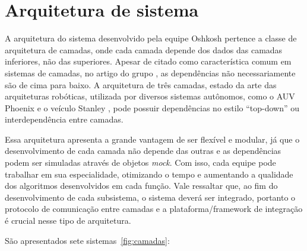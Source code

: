 \section{Arquitetura de sistema}

A arquitetura do sistema desenvolvido pela equipe Oshkosh pertence a classe de
arquitetura de camadas, onde cada camada depende dos dados das camadas
inferiores, não das superiores. Apesar de citado como característica comum
em sistemas de camadas, no artigo do grupo \citep{chen2009terramax}, as
dependências não necessariamente são de cima para baixo. A arquitetura de três
camadas, estado da arte das arquiteturas robóticas, utilizada por diversos
sistemas autônomos, como o AUV Phoenix \citep{gat1991reliable} e o veículo
Stanley \citep{montemerlo2006winning}, pode possuir dependências no estilo
``top-down'' ou interdependência entre camadas.

Essa arquitetura apresenta a grande vantagem de ser flexível e
modular, já que o desenvolvimento de cada camada não depende das outras e as
dependências podem ser simuladas através de objetos \textit{mock}. Com isso,
cada equipe pode trabalhar em sua especialidade, otimizando o tempo e
aumentando a qualidade dos algoritmos desenvolvidos em cada função. Vale
ressaltar que, ao fim do desenvolvimento de cada subsistema, o sistema deverá
ser integrado, portanto o protocolo de comunicação entre camadas e a
plataforma/framework de integração é crucial nesse tipo de arquitetura.

São apresentados sete sistemas~\ref{fig:camadas}: 
   

